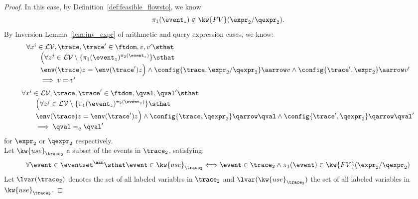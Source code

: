 \begin{proof}
%
In this case, by Definition~\ref{def:feasible_flowsto}, we know
\[
	\pi_1(\event_z) \notin \kw{FV}(\expr_2 / \qexpr_2).
	\]
By Inversion Lemma~\ref{lem:inv_expr}
 of arithmetic and query expression cases, we know:
%
\[
	\begin{array}{l}
		\forall x^i \in \mathcal{LV}, \trace, \trace' \in \ftdom, v, v' \sthat 
		\\ \qquad 
		\Big( \forall z^j \in \mathcal{LV} \setminus \{\pi_1(\event_z)^{\pi_2(\event_z)} \} \sthat  
		\\ \qquad 
		\env(\trace) z = \env(\trace') z \Big) \land 
	\config{\trace, \expr_2 / \qexpr_2} \aarrow v \land \config{\trace', \expr_2} \aarrow  v' \\ \qquad 
	\implies v = v'
\end{array}
\]
	\[
		\begin{array}{l}
			\forall x^i \in \mathcal{LV}, \trace, \trace' \in \ftdom, \qval, \qval' \sthat 
			\\ \qquad 
		\Big( \forall z^j \in \mathcal{LV} \setminus \{\pi_1(\event_z)^{\pi_2(\event_z)} \} \sthat  
		\\ \qquad 
		\env(\trace) z = \env(\trace') z \Big) \land 
		\config{\trace, \qexpr_2} \qarrow \qval \land \config{\trace', \qexpr_2} \qarrow \qval' 
		\\ \qquad 
		\implies \qval =_{q} \qval'
	\end{array}
	\]
for $\expr_2$ or $\qexpr_2$ respectively.
\\
Let $\kw{use}_{\trace_2}$ a subset of the events in $\trace_2$, satisfying: 
\[
	\begin{array}{l}
		\forall \event \in \eventset^{\asn} \sthat  
	\event \in \kw{use}_{\trace_2} \Longleftrightarrow 
	\event \in \trace_2 \land
	\pi_1(\event) \in \kw{FV}(\expr_2 / \qexpr_2)
\end{array}		
\]
Let $\lvar({\trace_2}) $ denotes the set of all labeled variables in $\trace_2$
and $\lvar({\kw{use}_{\trace_2}})$ the set of all labeled variables in ${\kw{use}_{\trace_2}}$.


\end{proof}
